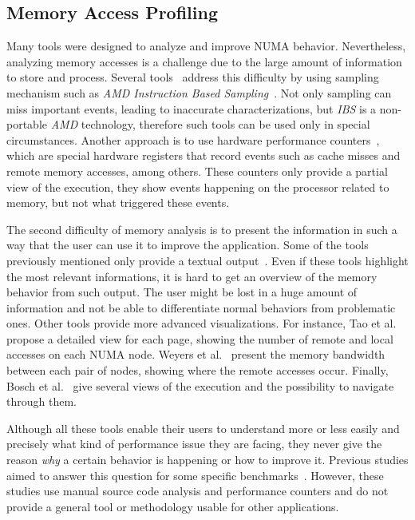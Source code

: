 \subsection{Memory Access Profiling}
\label{sec:soa-profiling}

Many tools were designed to analyze and improve NUMA behavior. Nevertheless, analyzing
memory accesses is a challenge due to the large amount of information to store and process.
Several tools~\cite{Lachaize12MemProf,McCurdy2010}  address this difficulty by
using sampling mechanism such as \emph{AMD  Instruction Based
Sampling}~\cite{Drongowski07Instructionbased}. Not only sampling can miss important events, leading to inaccurate characterizations, but \emph{IBS} is a non-portable \emph{AMD}
technology, therefore such tools can be used only in special circumstances. Another approach is to
use hardware performance counters~\cite{Majo13(Mis)understanding,
Jiang14Understanding,Bosch00Rivet,Weyers14Visualization,Tao01Visualizing},
which are special hardware registers that record events such as cache
misses and remote memory accesses, among others. These counters only provide a partial view
of the execution, they show events happening on the processor related to
memory, but not what triggered these events.

The second difficulty of memory analysis is to present the information in such a
way that the user can use it to improve the application. Some of the tools previously mentioned only provide
a textual output~\cite{Lachaize12MemProf,McCurdy2010}. Even if these tools highlight the most relevant informations, it is hard to get an overview of the memory behavior from such output. The user might be lost in a
huge amount of information and not be able to differentiate normal behaviors from
problematic ones. Other tools provide more advanced visualizations. For
instance, Tao et al.~\cite{Tao01Visualizing} propose a detailed view for each
page, showing the number of remote and local accesses on each NUMA node. Weyers et
al.~\cite{Weyers14Visualization} present the memory bandwidth between each pair of nodes,
showing where the remote accesses occur. Finally, Bosch et al.~\cite{Bosch00Rivet} give several views of the execution and the possibility to
navigate through them.

Although all these tools enable their users to understand more or less easily and
precisely what kind of performance issue they are facing, they never give the
reason \emph{why} a certain behavior is happening or how to improve it.
Previous studies aimed to answer this question for some specific
benchmarks~\cite{Majo13(Mis)understanding,Jiang14Understanding}.
However, these studies use manual source code analysis and performance counters and do not provide a general tool or methodology usable for other applications.

